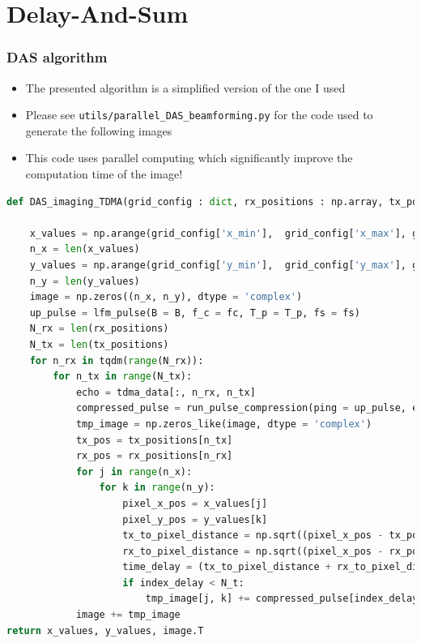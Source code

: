 \documentclass[UKenglish,8pt,aspectratio=1610]{beamer}
\begin{document}
\section{Delay-And-Sum}
\begin{frame}[fragile]
\frametitle{DAS algorithm}
\begin{itemize}
	\item The presented algorithm is a simplified version of the one I used
	\item Please see \texttt{utils/parallel\_DAS\_beamforming.py} for the code used to generate the following images
	\item This code uses parallel computing which significantly improve the computation time of the image!
\end{itemize}
\begin{lstlisting}[language=Python, style = mystyle, caption=Pulse compression code]
def DAS_imaging_TDMA(grid_config : dict, rx_positions : np.array, tx_positions : np.array, tdma_data : np.array, B : float, fc : float,c : float, T_p : float, N_t : float, fs : float) -> np.array:

	x_values = np.arange(grid_config['x_min'],  grid_config['x_max'], grid_config['x_step'])
	n_x = len(x_values)
	y_values = np.arange(grid_config['y_min'],  grid_config['y_max'], grid_config['y_step'])
	n_y = len(y_values)
	image = np.zeros((n_x, n_y), dtype = 'complex')
	up_pulse = lfm_pulse(B = B, f_c = fc, T_p = T_p, fs = fs)
	N_rx = len(rx_positions)
	N_tx = len(tx_positions)
	for n_rx in tqdm(range(N_rx)):
		for n_tx in range(N_tx):
			echo = tdma_data[:, n_rx, n_tx]
			compressed_pulse = run_pulse_compression(ping = up_pulse, echo = echo)
			tmp_image = np.zeros_like(image, dtype = 'complex')
			tx_pos = tx_positions[n_tx]
			rx_pos = rx_positions[n_rx]
			for j in range(n_x):
				for k in range(n_y):
					pixel_x_pos = x_values[j]
					pixel_y_pos = y_values[k]
					tx_to_pixel_distance = np.sqrt((pixel_x_pos - tx_pos) ** 2 + pixel_y_pos ** 2)
					rx_to_pixel_distance = np.sqrt((pixel_x_pos - rx_pos) ** 2 + pixel_y_pos ** 2)
					time_delay = (tx_to_pixel_distance + rx_to_pixel_distance) / c
					if index_delay < N_t:
						tmp_image[j, k] += compressed_pulse[index_delay]
			image += tmp_image
return x_values, y_values, image.T
\end{lstlisting}
\end{frame}
\end{document}

